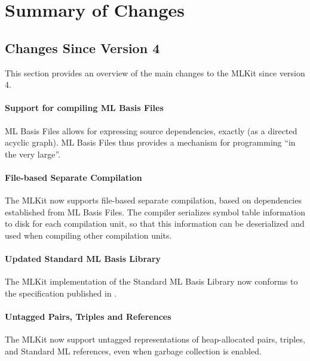 \documentclass[12pt]{book}
\begin{document}
\chapter{Summary of Changes}

\section{Changes Since Version 4}
%
This section provides an overview of the main changes to the MLKit
since version 4.

\subsubsection*{Support for compiling ML Basis Files}
%
ML Basis Files allows for expressing source dependencies, exactly (as
a directed acyclic graph). ML Basis Files thus provides a mechanism
for programming ``in the very large''.

\subsubsection*{File-based Separate Compilation}
%
The MLKit now supports file-based separate compilation, based on
dependencies established from ML Basis Files. The compiler serializes
symbol table information to disk for each compilation unit, so that
this information can be deserialized and used when compiling other
compilation units.

\subsubsection*{Updated Standard ML Basis Library}
%
%
The MLKit implementation of the Standard ML Basis Library now conforms to the
  specification published in \cite{basislib2004}. 

\subsubsection*{Untagged Pairs, Triples and References}
%
%
%
%
The MLKit now support untagged representations of heap-allocated
pairs, triples, and Standard ML references, even when garbage
collection is enabled.
\end{document}
